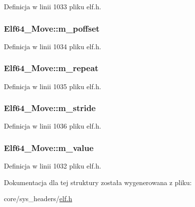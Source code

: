 Definicja w linii 1033 pliku elf.\-h.

\hypertarget{struct_elf64___move_a36fe21def9afee88be6acc62e45fdeba}{
\subsubsection[{m\-\_\-poffset}]{ Elf64\-\_\-\-Move\-::m\-\_\-poffset}}\label{struct_elf64___move_a36fe21def9afee88be6acc62e45fdeba}


Definicja w linii 1034 pliku elf.\-h.

\hypertarget{struct_elf64___move_ab6f1c59b8b9789cdd223fa525937dbdb}{
\subsubsection[{m\-\_\-repeat}]{ Elf64\-\_\-\-Move\-::m\-\_\-repeat}}\label{struct_elf64___move_ab6f1c59b8b9789cdd223fa525937dbdb}


Definicja w linii 1035 pliku elf.\-h.

\hypertarget{struct_elf64___move_ac999afc6aec249cd19ebbef408228c95}{
\subsubsection[{m\-\_\-stride}]{ Elf64\-\_\-\-Move\-::m\-\_\-stride}}\label{struct_elf64___move_ac999afc6aec249cd19ebbef408228c95}


Definicja w linii 1036 pliku elf.\-h.

\hypertarget{struct_elf64___move_ab6ef52b74b3742b569dcacc4a7f835df}{
\subsubsection[{m\-\_\-value}]{ Elf64\-\_\-\-Move\-::m\-\_\-value}}\label{struct_elf64___move_ab6ef52b74b3742b569dcacc4a7f835df}


Definicja w linii 1032 pliku elf.\-h.



Dokumentacja dla tej struktury została wygenerowana z pliku\-:\begin{DoxyCompactItemize}
\item 
core/sys\-\_\-headers/\hyperlink{elf_8h}{elf.\-h}\end{DoxyCompactItemize}

